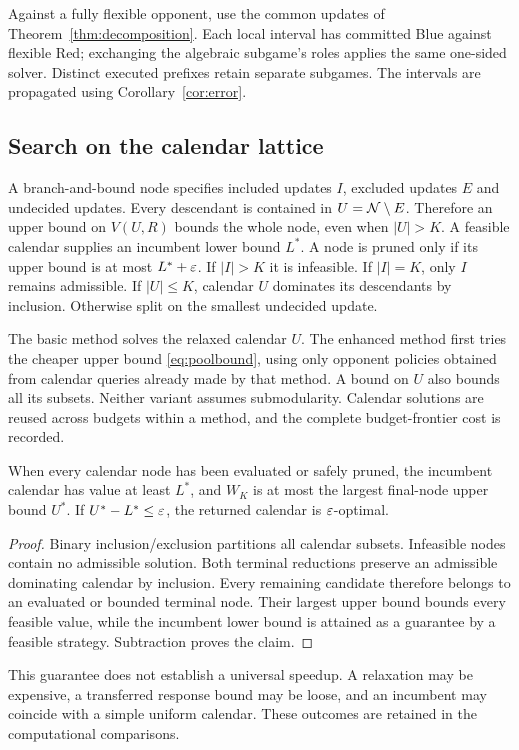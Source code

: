 Against a fully flexible opponent, use the common updates of
Theorem~\ref{thm:decomposition}. Each local interval has committed Blue
against flexible Red; exchanging the algebraic subgame's roles applies
the same one-sided solver. Distinct executed prefixes retain separate
subgames. The intervals are propagated using Corollary~\ref{cor:error}.

\subsection{Search on the calendar lattice}
A branch-and-bound node specifies included updates $I$, excluded updates
$E$ and undecided updates. Every descendant is contained in
$U=\mathcal N\setminus E$. Therefore an upper bound on $V(U,R)$ bounds the
whole node, even when $|U|>K$. A feasible calendar supplies an incumbent
lower bound $L^*$. A node is pruned only if its upper bound is at most
$L^*+\varepsilon$. If $|I|>K$ it is infeasible. If $|I|=K$, only $I$ remains
admissible. If $|U|\le K$, calendar $U$ dominates its descendants by
inclusion. Otherwise split on the smallest undecided update.

The basic method solves the relaxed calendar $U$. The enhanced method
first tries the cheaper upper bound \eqref{eq:poolbound}, using only
opponent policies obtained from calendar queries already made by that
method. A bound on $U$ also bounds all its subsets. Neither variant assumes
submodularity. Calendar solutions are reused across budgets within a method,
and the complete budget-frontier cost is recorded.

\begin{theorem}\label{thm:search}
When every calendar node has been evaluated or safely pruned, the incumbent
calendar has value at least $L^*$, and $W_K$ is at most the largest final-node
upper bound $U^*$. If $U^*-L^*\le\varepsilon$, the returned calendar is
$\varepsilon$-optimal.
\end{theorem}
\begin{proof}
Binary inclusion/exclusion partitions all calendar subsets. Infeasible nodes
contain no admissible solution. Both terminal reductions preserve an
admissible dominating calendar by inclusion. Every remaining candidate
therefore belongs to an evaluated or bounded terminal node. Their largest
upper bound bounds every feasible value, while the incumbent lower bound
is attained as a guarantee by a feasible strategy. Subtraction proves the
claim.
\end{proof}
This guarantee does not establish a universal speedup. A relaxation may
be expensive, a transferred response bound may be loose, and an incumbent
may coincide with a simple uniform calendar. These outcomes are retained
in the computational comparisons.

